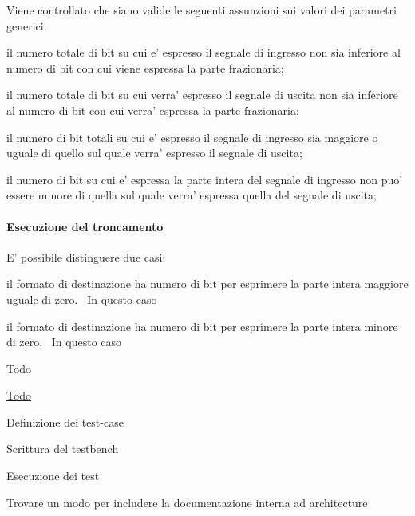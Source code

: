 Viene controllato che siano valide le seguenti assunzioni sui valori dei parametri generici\+:
\begin{DoxyItemize}
\item il numero totale di bit su cui e' espresso il segnale di ingresso non sia inferiore al numero di bit con cui viene espressa la parte frazionaria;
\item il numero totale di bit su cui verra' espresso il segnale di uscita non sia inferiore al numero di bit con cui verra' espressa la parte frazionaria;
\item il numero di bit totali su cui e' espresso il segnale di ingresso sia maggiore o uguale di quello sul quale verra' espresso il segnale di uscita;
\item il numero di bit su cui e' espressa la parte intera del segnale di ingresso non puo' essere minore di quella sul quale verra' espressa quella del segnale di uscita;
\end{DoxyItemize}

\paragraph*{Esecuzione del troncamento}

E' possibile distinguere due casi\+:
\begin{DoxyEnumerate}
\item il formato di destinazione ha numero di bit per esprimere la parte intera maggiore uguale di zero.~\newline
 In questo caso
\item il formato di destinazione ha numero di bit per esprimere la parte intera minore di zero.~\newline
 In questo caso
\end{DoxyEnumerate}

\begin{DoxyRefDesc}{Todo}
\item[\hyperlink{todo__todo000001}{Todo}]
\begin{DoxyItemize}
\item Definizione dei test-\/case
\item Scrittura del testbench
\item Esecuzione dei test
\item Trovare un modo per includere la documentazione interna ad architecture 
\end{DoxyItemize}\end{DoxyRefDesc}


